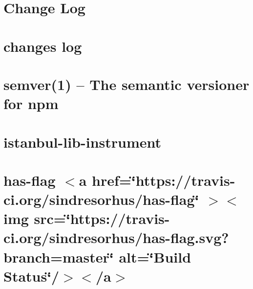 \documentclass[twoside]{book}
\newcommand{\+}{\discretionary{\mbox{\scriptsize$\hookleftarrow$}}{}{}}
\begin{document}
\chapter{Change Log}
\label{md__c___users_vaishnavi_jadhav__desktop__developer_code_mean_stack_example_client_node_modules_ic9ae1a7d03033e9cc0afc16c32ea7ece}

\chapter{changes log}
\label{md__c___users_vaishnavi_jadhav__desktop__developer_code_mean_stack_example_client_node_modules_i55dc395aeca64ad073d7f5400955b37d}

\chapter{semver(1) -- The semantic versioner for npm}
\label{md__c___users_vaishnavi_jadhav__desktop__developer_code_mean_stack_example_client_node_modules_i14fde4c7f2349a1ffa5923541ac5bd34}

\chapter{istanbul-\/lib-\/instrument}
\label{md__c___users_vaishnavi_jadhav__desktop__developer_code_mean_stack_example_client_node_modules_i17e0113df0fa7067562a847c509176f2}

\chapter{has-\/flag \texorpdfstring{$<$}{<}a href=\char`\"{}https\+://travis-\/ci.\+org/sindresorhus/has-\/flag\char`\"{} \texorpdfstring{$>$}{>}\texorpdfstring{$<$}{<}img src=\char`\"{}https\+://travis-\/ci.\+org/sindresorhus/has-\/flag.\+svg?branch=master\char`\"{} alt=\char`\"{}\+Build Status\char`\"{}/\texorpdfstring{$>$}{>}\texorpdfstring{$<$}{<}/a\texorpdfstring{$>$}{>}}
\label{md__c___users_vaishnavi_jadhav__desktop__developer_code_mean_stack_example_client_node_modules_j17f7a54d2f17071945275d9d83884414}

\end{document}
